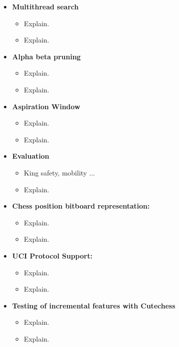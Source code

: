 \begin{itemize}
    \item \textbf{Multithread search}
    \begin{itemize}
        \item Explain.
        \item Explain.
    \end{itemize}
    
    \item \textbf{Alpha beta pruning}
    \begin{itemize}
        \item Explain.
        \item Explain.
    \end{itemize}

    \item \textbf{Aspiration Window}
    \begin{itemize}
        \item Explain.
        \item Explain.
    \end{itemize}

    \item \textbf{Evaluation}
    \begin{itemize}
        \item King safety, mobility ... 
        \item Explain.
    \end{itemize}

    \item \textbf{Chess position bitboard representation:}
    \begin{itemize}
        \item Explain.
        \item Explain.
    \end{itemize}

    \item \textbf{UCI Protocol Support:}
    \begin{itemize}
        \item Explain.
        \item Explain.
    \end{itemize}
  
    \item \textbf{Testing of incremental features with Cutechess}
    \begin{itemize}
        \item Explain.
        \item Explain.
    \end{itemize}


\end{itemize}
